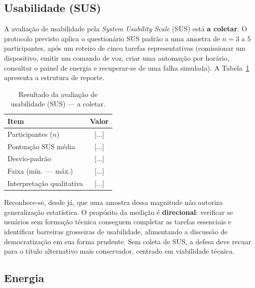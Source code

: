 \subsection{Usabilidade (SUS)}\label{sec:res-sus}

A avaliação de usabilidade pela \textit{System Usability Scale} (SUS) está \textbf{a
coletar}. O protocolo previsto aplica o questionário SUS padrão a uma amostra de
$n = 3$ a $5$ participantes, após um roteiro de cinco tarefas representativas
(comissionar um dispositivo, emitir um comando de voz, criar uma automação por horário,
consultar o painel de energia e recuperar-se de uma falha simulada). A
Tabela~\ref{tab:sus} apresenta a estrutura de reporte.

\begin{table}[H]
\centering
\caption{Resultado da avaliação de usabilidade (SUS) --- a coletar.}
\label{tab:sus}
\begin{tabular}{@{}lc@{}}
\toprule
\textbf{Item} & \textbf{Valor} \\
\midrule
Participantes ($n$)          & [...] \\
Pontuação SUS média          & [...] \\
Desvio-padrão                & [...] \\
Faixa (mín.\ --- máx.)       & [...] \\
Interpretação qualitativa    & [...] \\
\bottomrule
\end{tabular}
\end{table}

Reconhece-se, desde já, que uma amostra dessa magnitude não autoriza generalização
estatística. O propósito da medição é \textbf{direcional}: verificar se usuários sem
formação técnica conseguem completar as tarefas essenciais e identificar barreiras
grosseiras de usabilidade, alimentando a discussão de democratização em sua forma
prudente. Sem coleta de SUS, a defesa deve recuar para o título alternativo mais
conservador, centrado em viabilidade técnica.

\subsection{Energia}\label{sec:res-energia}

